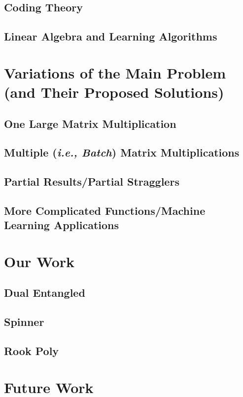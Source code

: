 \documentclass{report}
\begin{document}
\section{Coding Theory}\label{sec:code}


\section{Linear Algebra and Learning Algorithms}\label{sec:lin}



\chapter{Variations of the Main Problem ({and Their Proposed Solutions})}

\section{One Large Matrix Multiplication}

\section{Multiple (\emph{i.e., Batch}) Matrix Multiplications}

\section{Partial Results/Partial Stragglers}

\section{More Complicated Functions/Machine Learning Applications}





\chapter{Our Work}

\section{Dual Entangled}

\section{Spinner}

\section{Rook Poly}

\chapter{Future Work}



\end{document}
